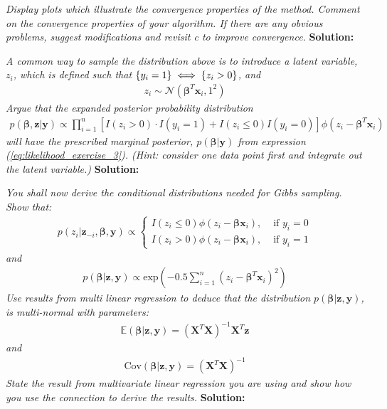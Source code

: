 \emph{Display plots which illustrate the convergence properties of the method. Comment on
the convergence properties of your algorithm. If there are any obvious problems,
suggest modifications and revisit c to improve convergence.} \spaze 
\textbf{Solution:} \spaze

\emph{A common way to sample the distribution above is to introduce a latent variable, $z_i$, which is
defined such that $\left\{ y_i = 1 \right\} \iff \left\{ z_i > 0\right\}$, and}
\begin{align}
    z_i \sim \mathcal{N} \left( \boldsymbol{\beta}^T \boldsymbol{x}_i, 1^2 \right)
\end{align}
\emph{Argue that the expanded posterior probability distribution}
\begin{align*}
p\left(\boldsymbol{\beta}, \boldsymbol{z} | \boldsymbol{y} \right) \propto  \prod_{i=1}^{n} \left[I(z_i > 0) \cdot I(y_i = 1) + I(z_i \leq 0) I(y_i=0) \right] \phi \left( z_i - \boldsymbol{\beta}^T \boldsymbol{x}_i \right)
\end{align*}
\emph{will have the prescribed marginal posterior, $p(\boldsymbol{\beta} | \boldsymbol{y})$ from expression (\ref{eq:likelihood_exercise_3}). (Hint: consider one data point first and integrate out the latent variable.)} \spaze
\textbf{Solution:} \spaze

\emph{You shall now derive the conditional distributions needed for Gibbs sampling. Show
that:}
\begin{align*}
    p(z_i | \boldsymbol{z}_{-i}, \boldsymbol{\beta}, \boldsymbol{y}) \propto \begin{cases}
      I(z_i \leq 0) \phi(z_i - \boldsymbol{\beta} \boldsymbol{x}_i),   & \text{ if } y_i = 0 \\[5pt]
      I(z_i > 0) \phi(z_i - \boldsymbol{\beta} \boldsymbol{x}_i),   & \text{ if } y_i = 1
    \end{cases}
\end{align*}
\emph{and} 
\begin{align*}
    p(\boldsymbol{\beta} | \boldsymbol{z}, \boldsymbol{y}) \propto \text{exp} \left(-0.5 \sum_{i=1}^{n} (z_i - \boldsymbol{\beta}^T \boldsymbol{x}_i)^2 \right)
\end{align*}
\emph{Use results from multi linear regression to deduce that the distribution $p(\boldsymbol{\beta} | \boldsymbol{z}, \boldsymbol{y})$, is multi-normal with parameters:}
\begin{align*}
    \mathbb{E}(\boldsymbol{\beta} | \boldsymbol{z}, \boldsymbol{y}) = \left(\boldsymbol{X}^T \boldsymbol{X} \right)^{-1}\boldsymbol{X}^T \boldsymbol{z}
\end{align*}
\emph{and}
\begin{align*}
    \text{Cov}(\boldsymbol{\beta} | \boldsymbol{z}, \boldsymbol{y}) = (\boldsymbol{X}^T \boldsymbol{X})^{-1}
\end{align*}
\emph{State the result from multivariate linear regression you are using and show how you use
the connection to derive the results.} \spaze
\textbf{Solution:} \spaze

